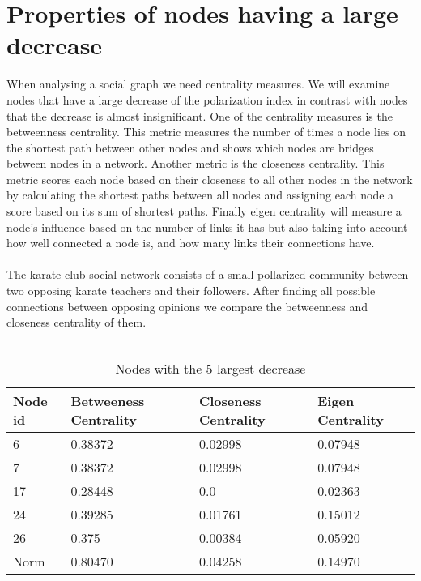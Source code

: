 \section{Properties of nodes having a large decrease}
\label{sec:properties}

When analysing a social graph we need centrality measures. We will examine nodes that have a large decrease of the polarization index in contrast with nodes that the decrease is almost insignificant. 
One of the centrality measures is the betweenness centrality. This metric measures the number of times a node lies on the shortest path between other nodes and shows which nodes are bridges between nodes in a network. 
Another metric is the closeness centrality. This metric scores each node based on their closeness to all other nodes in the network by calculating the shortest paths between all nodes and assigning each node a score based on its sum of shortest paths. 
Finally eigen centrality will measure a node's influence based on the number of links it has but also taking into account how well connected a node is, and how many links their connections have.
\\
\\
The karate club social network\cite{nr} consists of a small pollarized community between two opposing karate teachers and their followers. After finding all possible connections between opposing opinions we compare the betweenness and closeness centrality of them.
\\
\\

\begin{table}[t]
 \centering
 \caption{Nodes with the 5 largest decrease}
 \label{tab:nodesLargest}
 \begin{tabular}{| l || l | l | l |}
 \hline
  Node id & Betweeness Centrality& Closeness Centrality & Eigen Centrality\\
  \hline
  \hline
  6 & 0.38372 & 0.02998 & 0.07948\\
  \hline
  7 & 0.38372 & 0.02998 & 0.07948\\
  \hline
  17 & 0.28448 & 0.0 &  0.02363\\
  \hline
  24 & 0.39285 & 0.01761 & 0.15012\\
  \hline
  26 & 0.375 & 0.00384 & 0.05920\\
  \hline
  \hline
  Norm & 0.80470 & 0.04258 & 0.14970\\ 
  \hline
 \end{tabular}
\end{table}



